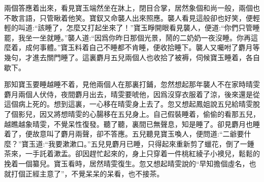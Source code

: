 \begin{parag}
    兩個答應着出來，看見寶玉端然坐在牀上，閉目合掌，居然象個和尚一般，兩個也不敢言語，只管瞅着他笑。寶釵又命襲人出來照應。襲人看見這般卻也好笑，便輕輕的叫道:“該睡了，怎麼又打起坐來了！”寶玉睜開眼看見襲人，便道:“你們只管睡罷，我坐一坐就睡。”襲人道:“因爲你昨日那個光景，鬧的二奶奶一夜沒睡。你再這麼着，成何事體。”寶玉料着自己不睡都不肯睡，便收拾睡下。襲人又囑咐了麝月等幾句，才進去關門睡了。這裏麝月五兒兩個人也收拾了被褥，伺候寶玉睡着，各自歇下。
\end{parag}


\begin{parag}
    那知寶玉要睡越睡不着，見他兩個人在那裏打鋪，忽然想起那年襲人不在家時晴雯麝月兩個人伏侍，夜間麝月出去，晴雯要唬他，因爲沒穿衣服着了涼，後來還是從這個病上死的。想到這裏，一心移在晴雯身上去了。忽又想起鳳姐說五兒給晴雯脫了個影兒，因又將想晴雯的心腸移在五兒身上。自己假裝睡着，偷偷的看那五兒，越瞧越象晴雯，不覺呆性復發。聽了聽，裏間已無聲息，知是睡了。卻見麝月也睡着了，便故意叫了麝月兩聲，卻不答應。五兒聽見寶玉喚人，便問道:“二爺要什麼？”寶玉道:“我要漱漱口。”五兒見麝月已睡，只得起來重新剪了蠟花，倒了一鍾茶來，一手託着漱盂。卻因趕忙起來的，身上只穿着一件桃紅綾子小襖兒，鬆鬆的挽着一個纂兒。寶玉看時，居然晴雯復生。忽又想起晴雯說的“早知擔個虛名，也就打個正經主意了”，不覺呆呆的呆看，也不接茶。
\end{parag}


